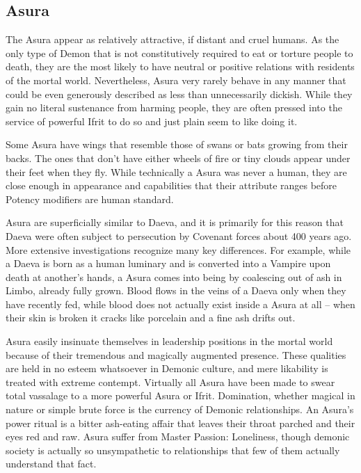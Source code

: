 \subsection{Asura} 

The Asura appear as relatively attractive, if distant and cruel humans. As the only type of Demon that is not constitutively required to eat or torture people to death, they are the most likely to have neutral or positive relations with residents of the mortal world. Nevertheless, Asura very rarely behave in any manner that could be even generously described as less than unnecessarily dickish. While they gain no literal sustenance from harming people, they are often pressed into the service of powerful Ifrit to do so and just plain seem to like doing it.

Some Asura have wings that resemble those of swans or bats growing from their backs. The ones that don't have either wheels of fire or tiny clouds appear under their feet when they fly. While technically a Asura was never a human, they are close enough in appearance and capabilities that their attribute ranges before Potency modifiers are human standard.

Asura are superficially similar to Daeva, and it is primarily for this reason that Daeva were often subject to persecution by Covenant forces about 400 years ago. More extensive investigations recognize many key differences. For example, while a Daeva is born as a human luminary and is converted into a Vampire upon death at another's hands, a Asura comes into being by coalescing out of ash in Limbo, already fully grown. Blood flows in the veins of a Daeva only when they have recently fed, while blood does not actually exist inside a Asura at all -- when their skin is broken it cracks like porcelain and a fine ash drifts out.

Asura easily insinuate themselves in leadership positions in the mortal world because of their tremendous and magically augmented presence. These qualities are held in no esteem whatsoever in Demonic culture, and mere likability is treated with extreme contempt. Virtually all Asura have been made to swear total vassalage to a more powerful Asura or Ifrit. Domination, whether magical in nature or simple brute force is the currency of Demonic relationships. An Asura's power ritual is a bitter ash-eating affair that leaves their throat parched and their eyes red and raw. Asura suffer from Master Passion: Loneliness, though demonic society is actually so unsympathetic to relationships that few of them actually understand that fact.

